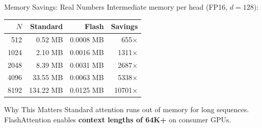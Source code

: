 \documentclass[aspectratio=169,10pt]{beamer}
\begin{document}
\begin{frame}{Memory Savings: Real Numbers}
    Intermediate memory per head (FP16, $d=128$):

    \vspace{0.3cm}
    \begin{table}
        \centering
        \small
        \begin{tabular}{rrrr}
            \toprule
            \textbf{$N$} & \textbf{Standard} & \textbf{Flash} & \textbf{Savings} \\
            \midrule
            512 & 0.52 MB & 0.0008 MB & 655× \\
            1024 & 2.10 MB & 0.0016 MB & 1311× \\
            2048 & 8.39 MB & 0.0031 MB & 2687× \\
            4096 & 33.55 MB & 0.0063 MB & 5338× \\
            8192 & 134.22 MB & 0.0125 MB & 10701× \\
            \bottomrule
        \end{tabular}
    \end{table}

    \vspace{0.5cm}
    \begin{block}{Why This Matters}
        Standard attention runs out of memory for long sequences. \\
        FlashAttention enables \textbf{context lengths of 64K+} on consumer GPUs.
    \end{block}
\end{frame}
\end{document}
